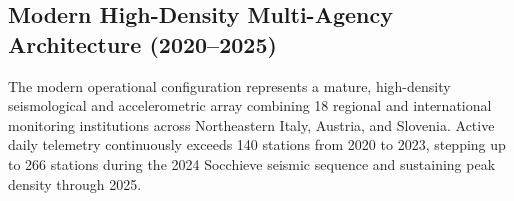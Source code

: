 \clearpage


\subsection*{Modern High-Density Multi-Agency Architecture (2020--2025)}
The modern operational configuration represents a mature, high-density
seismological and accelerometric array combining 18 regional and international
monitoring institutions across Northeastern Italy, Austria, and Slovenia.
Active daily telemetry continuously exceeds 140 stations from 2020 to 2023,
stepping up to 266 stations during the 2024 Socchieve seismic sequence and
sustaining peak density through 2025.

